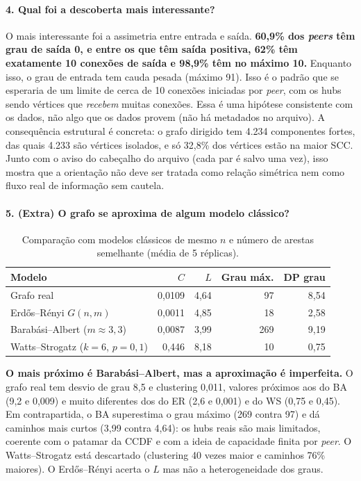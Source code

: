 \documentclass[10pt,a4paper,twocolumn]{article}
\begin{document}
\paragraph{4. Qual foi a descoberta mais interessante?}
O mais interessante foi a assimetria entre entrada e saída. \textbf{60,9\% dos \emph{peers} têm grau de saída 0, e entre os que têm saída positiva, 62\% têm exatamente 10 conexões de saída e 98,9\% têm no máximo 10.} Enquanto isso, o grau de entrada tem cauda pesada (máximo 91). Isso é o padrão que se esperaria de um limite de cerca de 10 conexões iniciadas por \emph{peer}, com os hubs sendo vértices que \emph{recebem} muitas conexões. Essa é uma hipótese consistente com os dados, não algo que os dados provem (não há metadados no arquivo). A consequência estrutural é concreta: o grafo dirigido tem 4.234 componentes fortes, das quais 4.233 são vértices isolados, e só 32,8\% dos vértices estão na maior SCC. Junto com o aviso do cabeçalho do arquivo (cada par é salvo uma vez), isso mostra que a orientação não deve ser tratada como relação simétrica nem como fluxo real de informação sem cautela.

\paragraph{5. (Extra) O grafo se aproxima de algum modelo clássico?}
\begin{table}[t]\centering\scriptsize
\caption{Comparação com modelos clássicos de mesmo $n$ e número de arestas semelhante (média de 5 réplicas).}\label{tab:mod}
\begin{tabular}{lrrrr}\toprule
Modelo & $C$ & $L$ & Grau máx. & DP grau \\\midrule
Grafo real & 0,0109 & 4,64 & 97 & 8,54 \\
Erdős--Rényi $G(n,m)$ & 0,0011 & 4,85 & 18 & 2,58 \\
Barabási--Albert ($m\approx3{,}3$) & 0,0087 & 3,99 & 269 & 9,19 \\
Watts--Strogatz ($k=6$, $p=0{,}1$) & 0,446 & 8,18 & 10 & 0,75 \\\bottomrule
\end{tabular}
\end{table}
\noindent \textbf{O mais próximo é Barabási--Albert, mas a aproximação é imperfeita.} O grafo real tem desvio de grau 8,5 e clustering 0,011, valores próximos aos do BA (9,2 e 0,009) e muito diferentes dos do ER (2,6 e 0,001) e do WS (0,75 e 0,45). Em contrapartida, o BA superestima o grau máximo (269 contra 97) e dá caminhos mais curtos (3,99 contra 4,64): os hubs reais são mais limitados, coerente com o patamar da CCDF e com a ideia de capacidade finita por \emph{peer}. O Watts--Strogatz está descartado (clustering 40 vezes maior e caminhos 76\% maiores). O Erdős--Rényi acerta o $L$ mas não a heterogeneidade dos graus.
\end{document}
